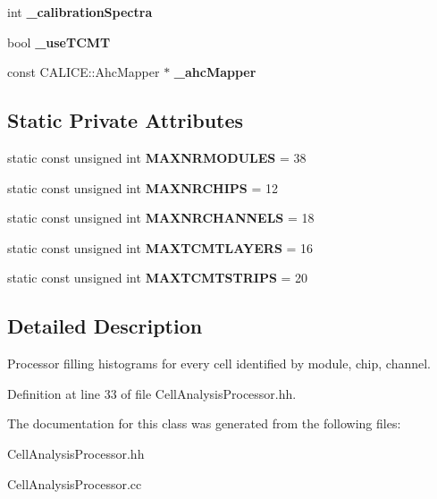 \begin{DoxyCompactItemize}
\item 
int {\bfseries \-\_\-calibration\-Spectra}\label{classCellAnalysisProcessor_a75de8ff1fc14d9ae09721819c3aff65d}

\item 
bool {\bfseries \-\_\-use\-T\-C\-M\-T}\label{classCellAnalysisProcessor_af0fcd0ebc329224397f66672642d7ee6}

\item 
const C\-A\-L\-I\-C\-E\-::\-Ahc\-Mapper $\ast$ {\bfseries \-\_\-ahc\-Mapper}\label{classCellAnalysisProcessor_a0cabfd5fcde81a59e8b22f55fb468f2d}

\end{DoxyCompactItemize}
\subsection*{Static Private Attributes}
\begin{DoxyCompactItemize}
\item 
static const unsigned int {\bfseries M\-A\-X\-N\-R\-M\-O\-D\-U\-L\-E\-S} = 38\label{classCellAnalysisProcessor_a2dfcec3ca068b0f9a2855d5e20985150}

\item 
static const unsigned int {\bfseries M\-A\-X\-N\-R\-C\-H\-I\-P\-S} = 12\label{classCellAnalysisProcessor_a7d6d32672684ef32a52ab06fd81a180b}

\item 
static const unsigned int {\bfseries M\-A\-X\-N\-R\-C\-H\-A\-N\-N\-E\-L\-S} = 18\label{classCellAnalysisProcessor_a40721bcdbc533caa0e84417544e7a43c}

\item 
static const unsigned int {\bfseries M\-A\-X\-T\-C\-M\-T\-L\-A\-Y\-E\-R\-S} = 16\label{classCellAnalysisProcessor_aafc3097ebf7f58966a5e5b2ec122ccba}

\item 
static const unsigned int {\bfseries M\-A\-X\-T\-C\-M\-T\-S\-T\-R\-I\-P\-S} = 20\label{classCellAnalysisProcessor_a276eab4e0cd0901968f659a727dd18a0}

\end{DoxyCompactItemize}


\subsection{Detailed Description}
Processor filling histograms for every cell identified by module, chip, channel. 

Definition at line 33 of file Cell\-Analysis\-Processor.\-hh.



The documentation for this class was generated from the following files\-:\begin{DoxyCompactItemize}
\item 
Cell\-Analysis\-Processor.\-hh\item 
Cell\-Analysis\-Processor.\-cc\end{DoxyCompactItemize}
